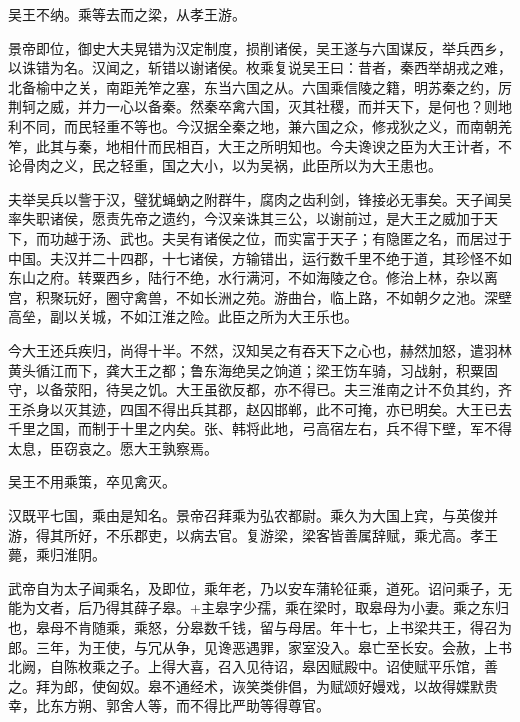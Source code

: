 \documentclass[12pt,UTF8]{ctexbook}
\begin{document}
吴王不纳。乘等去而之梁，从孝王游。



景帝即位，御史大夫晃错为汉定制度，损削诸侯，吴王遂与六国谋反，举兵西乡，以诛错为名。汉闻之，斩错以谢诸侯。枚乘复说吴王曰：昔者，秦西举胡戎之难，北备榆中之关，南距羌笮之塞，东当六国之从。六国乘信陵之籍，明苏秦之约，厉荆轲之威，并力一心以备秦。然秦卒禽六国，灭其社稷，而并天下，是何也？则地利不同，而民轻重不等也。今汉据全秦之地，兼六国之众，修戎狄之义，而南朝羌笮，此其与秦，地相什而民相百，大王之所明知也。今夫谗谀之臣为大王计者，不论骨肉之义，民之轻重，国之大小，以为吴祸，此臣所以为大王患也。



夫举吴兵以訾于汉，璧犹蝇蚋之附群牛，腐肉之齿利剑，锋接必无事矣。天子闻吴率失职诸侯，愿责先帝之遗约，今汉亲诛其三公，以谢前过，是大王之威加于天下，而功越于汤、武也。夫吴有诸侯之位，而实富于天子；有隐匿之名，而居过于中国。夫汉并二十四郡，十七诸侯，方输错出，运行数千里不绝于道，其珍怪不如东山之府。转粟西乡，陆行不绝，水行满河，不如海陵之仓。修治上林，杂以离宫，积聚玩好，圈守禽兽，不如长洲之苑。游曲台，临上路，不如朝夕之池。深壁高垒，副以关城，不如江淮之险。此臣之所为大王乐也。



今大王还兵疾归，尚得十半。不然，汉知吴之有吞天下之心也，赫然加怒，遣羽林黄头循江而下，龚大王之都；鲁东海绝吴之饷道；梁王饬车骑，习战射，积粟固守，以备荥阳，待吴之饥。大王虽欲反都，亦不得已。夫三淮南之计不负其约，齐王杀身以灭其迹，四国不得出兵其郡，赵囚邯郸，此不可掩，亦已明矣。大王已去千里之国，而制于十里之内矣。张、韩将此地，弓高宿左右，兵不得下壁，军不得太息，臣窃哀之。愿大王孰察焉。



吴王不用乘策，卒见禽灭。



汉既平七国，乘由是知名。景帝召拜乘为弘农都尉。乘久为大国上宾，与英俊并游，得其所好，不乐郡吏，以病去官。复游梁，梁客皆善属辞赋，乘尤高。孝王薨，乘归淮阴。



武帝自为太子闻乘名，及即位，乘年老，乃以安车蒲轮征乘，道死。诏问乘子，无能为文者，后乃得其薛子皋。+主皋字少孺，乘在梁时，取皋母为小妻。乘之东归也，皋母不肯随乘，乘怒，分皋数千钱，留与母居。年十七，上书梁共王，得召为郎。三年，为王使，与冗从争，见谗恶遇罪，家室没入。皋亡至长安。会赦，上书北阙，自陈枚乘之子。上得大喜，召入见待诏，皋因赋殿中。诏使赋平乐馆，善之。拜为郎，使匈奴。皋不通经术，诙笑类俳倡，为赋颂好嫚戏，以故得媟默贵幸，比东方朔、郭舍人等，而不得比严助等得尊官。
\end{document}
